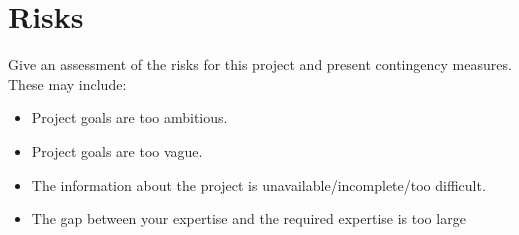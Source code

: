 \section{Risks} 
Give an assessment of the risks for this project and present contingency measures. These may include:
\begin{itemize}
    \item Project goals are too ambitious.
	\item	  Project goals are too vague.
	\item	  The information about the project is unavailable/incomplete/too difficult.
	\item	  The gap between your expertise and the required expertise is too large 
\end{itemize}